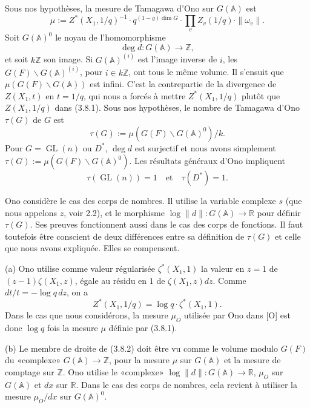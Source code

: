 \documentclass[10pt]{article}
\newcommand{\Z}{\mathbb Z}
\newcommand{\Adele}{\mathbb A}
\newcommand{\GL}{\operatorname{GL}}
\newcommand{\degm}{\operatorname{deg}}
\theoremstyle{deligne}
\newcommand{\heading}[1]{\vspace{0.7em}\noindent{\bfseries #1}\quad}
\begin{document}
Sous nos hypothèses, la mesure de Tamagawa d'Ono sur $G(\Adele)$ est
\begin{equation}\tag{3.8.1}
\mu:=Z^*(X_1,1/q)^{-1}\cdot q^{(1-g)\dim G}\cdot\prod_v Z_v(1/q)\cdot\|\omega_v\|.
\end{equation}
Soit $G(\Adele)^0$ le noyau de l'homomorphisme
\[
\degm d:G(\Adele)\longrightarrow\Z,
\]
et soit $k\Z$ son image. Si $G(\Adele)^{(i)}$ est l'image inverse de $i$, les $G(F)\backslash G(\Adele)^{(i)}$, pour $i\in k\Z$, ont tous le même volume. Il s'ensuit que $\mu(G(F)\backslash G(\Adele))$ est infini. C'est la contrepartie de la divergence de $Z(X_1,t)$ en $t=1/q$, qui nous a forcés à mettre $Z^*(X_1,1/q)$ plutôt que $Z(X_1,1/q)$ dans (3.8.1). Sous nos hypothèses, le nombre de Tamagawa d'Ono $\tau(G)$ de $G$ est
\begin{equation}\tag{3.8.2}
\tau(G):=\mu(G(F)\backslash G(\Adele)^0)/k.
\end{equation}
Pour $G=\GL(n)$ ou $D^*$, $\degm d$ est surjectif et nous avons simplement $\tau(G):=\mu(G(F)\backslash G(\Adele)^0)$. Les résultats généraux d'Ono impliquent
\begin{equation}\tag{3.8.3}
\tau(\GL(n))=1\quad\text{et}\quad \tau(D^*)=1.
\end{equation}

\heading{3.9. Remarque.} Ono considère le cas des corps de nombres. Il utilise la variable complexe $s$ (que nous appelons $z$, voir 2.2), et le morphisme $\log\|d\|:G(\Adele)\to\mathbb R$ pour définir $\tau(G)$. Ses preuves fonctionnent aussi dans le cas des corps de fonctions. Il faut toutefois être conscient de deux différences entre sa définition de $\tau(G)$ et celle que nous avons expliquée. Elles se compensent.

(a) Ono utilise comme valeur régularisée $\zeta^*(X_1,1)$ la valeur en $z=1$ de $(z-1)\zeta(X_1,z)$, égale au résidu en $1$ de $\zeta(X_1,z)dz$. Comme $dt/t=-\log q\,dz$, on a
\[
Z^*(X_1,1/q)=\log q\cdot\zeta^*(X_1,1).
\]
Dans le cas que nous considérons, la mesure $\mu_O$ utilisée par Ono dans [O] est donc $\log q$ fois la mesure $\mu$ définie par (3.8.1).

(b) Le membre de droite de (3.8.2) doit être vu comme le volume modulo $G(F)$ du «complexe» $G(\Adele)\to\Z$, pour la mesure $\mu$ sur $G(\Adele)$ et la mesure de comptage sur $\Z$. Ono utilise le «complexe» $\log\|d\|:G(\Adele)\to\mathbb R$, $\mu_O$ sur $G(\Adele)$ et $dx$ sur $\mathbb R$. Dans le cas des corps de nombres, cela revient à utiliser la mesure $\mu_O/dx$ sur $G(\Adele)^0$.
\end{document}
